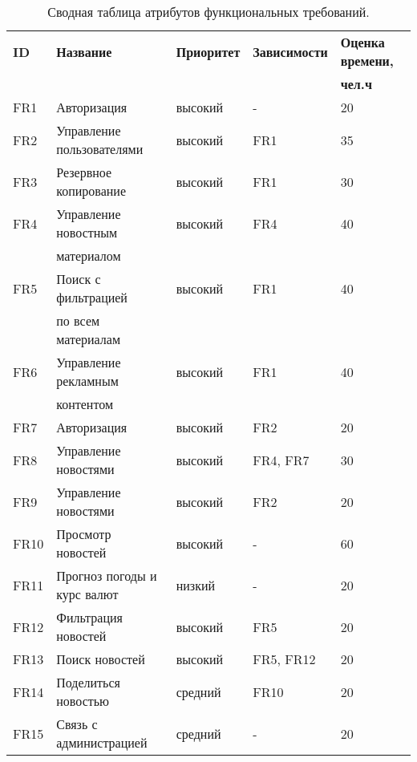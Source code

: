 \begin{table}[]
    \centering
    \begin{tabular}{|l|l|l|l|l|}\hline
\textbf{ID}	&	\textbf{Название}	&	\textbf{Приоритет}	&	\textbf{Зависимости}	&	\textbf{Оценка времени,} 	\\	
	&		&		&		&	\textbf{чел.ч}	\\	\hline
FR1	&	Авторизация	&	высокий	&	-	&	20	\\	\hline
FR2	&	Управление пользователями	&	высокий	&	FR1	&	35	\\	\hline
FR3	&	Резервное копирование	&	высокий	&	FR1	&	30	\\	\hline
FR4	&	Управление новостным 	&	высокий	&	FR4	&	40	\\	
	&	материалом	&		&		&		\\	\hline
FR5	&	Поиск с фильтрацией	&	высокий	&	FR1	&	40	\\	
	&	по всем материалам	&		&		&		\\	\hline
FR6	&	Управление рекламным	&	высокий	&	FR1	&	40	\\	
	&	контентом	&		&		&		\\	\hline
FR7	&	Авторизация	&	высокий	&	FR2	&	20	\\	\hline
FR8	&	Управление новостями	&	высокий	&	FR4, FR7	&	30	\\	\hline
FR9	&	Управление новостями	&	высокий	&	FR2	&	20	\\	\hline
FR10	&	Просмотр новостей	&	высокий	&	-	&	60	\\	\hline
FR11	&	Прогноз погоды и курс валют	&	низкий	&	-	&	20	\\	\hline
FR12	&	Фильтрация новостей	&	высокий	&	FR5	&	20	\\	\hline
FR13	&	Поиск новостей	&	высокий	&	FR5, FR12	&	20	\\	\hline
FR14	&	Поделиться новостью	&	средний	&	FR10	&	20	\\	\hline
FR15	&	Связь с администрацией	&	средний	&	-	&	20	\\	\hline
    \end{tabular}
    \caption{Сводная таблица атрибутов функциональных требований.}
    \label{tab:fr-summary}
\end{table}